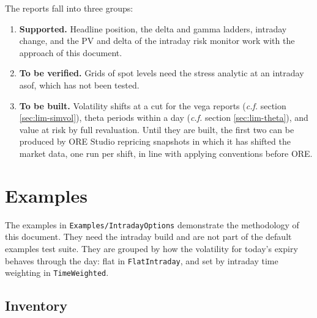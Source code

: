 \documentclass[12pt, a4paper]{article}
\begin{document}
The reports fall into three groups:

\begin{enumerate}
\item \textbf{Supported.} Headline position, the delta and gamma ladders, intraday change, and the PV and delta of the
  intraday risk monitor work with the approach of this document.
\item \textbf{To be verified.} Grids of spot levels need the stress analytic at an intraday asof, which has not been
  tested.
\item \textbf{To be built.} Volatility shifts at a cut for the vega reports (\textit{c.f.} section
  \ref{sec:lim-simvol}), theta periods within a day (\textit{c.f.} section \ref{sec:lim-theta}), and value at risk
  by full revaluation. Until they are built, the first two can be produced by ORE Studio repricing snapshots in which
  it has shifted the market data, one run per shift, in line with applying conventions before ORE.
\end{enumerate}

\section{Examples}\label{sec:examples}

The examples in \texttt{Examples/IntradayOptions} demonstrate the methodology of this document. They need the intraday
build and are not part of the default examples test suite. They are grouped by how the volatility for today's expiry
behaves through the day: flat in \texttt{FlatIntraday}, and set by intraday time weighting in \texttt{TimeWeighted}.

\subsection{Inventory}
\end{document}

